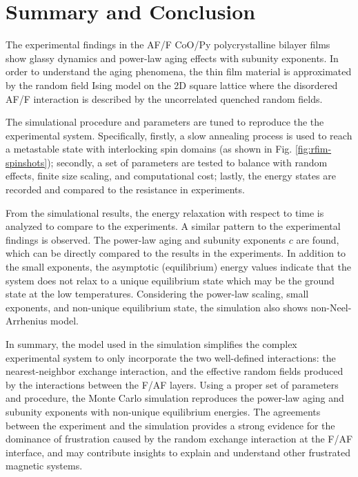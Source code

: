 \section{Summary and Conclusion}
The experimental findings in the AF/F CoO/Py polycrystalline bilayer films show glassy dynamics and power-law aging effects with subunity exponents. In order to understand the aging phenomena, the thin film material is approximated by the random field Ising model on the 2D square lattice where the disordered AF/F interaction is described by the uncorrelated quenched random fields.

The simulational procedure and parameters are tuned to reproduce the the experimental system. Specifically, firstly, a slow annealing process is used to reach a metastable state with interlocking spin domains (as shown in Fig. \ref{fig:rfim-spinshots}); secondly, a set of parameters are tested to balance with random effects, finite size scaling, and computational cost; lastly, the energy states are recorded and compared to the resistance in experiments.

From the simulational results, the energy relaxation with respect to time is analyzed to compare to the experiments. A similar pattern to the experimental findings is observed. The power-law aging and subunity exponents $c$ are found, which can be directly compared to the results in the experiments. In addition to the small exponents, the asymptotic (equilibrium) energy values indicate that the system does not relax to a unique equilibrium state which may be the ground state at the low temperatures. Considering the power-law scaling, small exponents, and non-unique equilibrium state, the simulation also shows non-Neel-Arrhenius model.

In summary, the model used in the simulation simplifies the complex experimental system to only incorporate the two well-defined interactions: the nearest-neighbor exchange interaction, and the effective random fields produced by the interactions between the F/AF layers. Using a proper set of parameters and procedure, the Monte Carlo simulation reproduces the power-law aging and subunity exponents with non-unique equilibrium energies. The agreements between the experiment and the simulation provides a strong evidence for the dominance of frustration caused by the random exchange interaction at the F/AF interface, and may contribute insights to explain and understand other frustrated magnetic systems.

  





